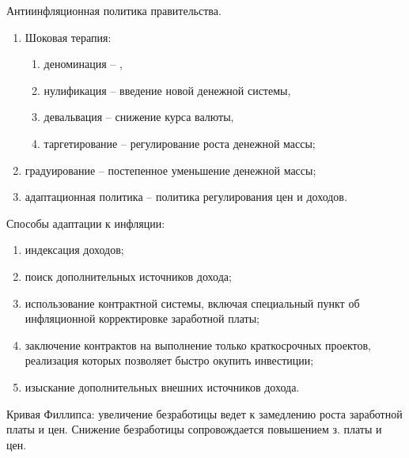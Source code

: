 Антиинфляционная политика правительства.
\begin{enumerate}
    \item Шоковая терапия:
    \begin{enumerate}
        \item деноминация -- ,
        \item нулификация -- введение новой денежной системы,
        \item девальвация -- снижение курса валюты,
        \item таргетирование -- регулирование роста денежной массы;
    \end{enumerate}
    \item градуирование -- постепенное уменьшение денежной массы;
    \item адаптационная политика -- политика регулирования цен и доходов.
\end{enumerate}

Способы адаптации к инфляции:
\begin{enumerate}
    \item индексация доходов;
    \item поиск дополнительных источников дохода;
    \item использование контрактной системы, включая специальный пункт об
    инфляционной корректировке заработной платы;
    \item заключение контрактов на выполнение только краткосрочных проектов,
    реализация которых позволяет быстро окупить инвестиции;
    \item изыскание дополнительных внешних источников дохода.
\end{enumerate}

Кривая Филлипса:
увеличение безработицы ведет к замедлению роста заработной платы и цен.
Снижение безработицы сопровождается повышением з. платы и цен.
